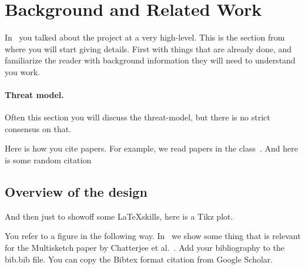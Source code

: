 \section{Background and Related Work}
\label{sec:relwork}
In~ you talked about the project at a very high-level. This is
the section from where you will start giving details. First with things that are
already done, and familiarize the reader with background information they will
need to understand you work. 


\paragraph{Threat model.}
Often this section you will discuss the threat-model, but there is no strict consensus on that. 


Here is how you cite papers. For example, we read papers in the
class~\cite{rahul2016pwtypos,dodisetal:2004}.  And here is some random citation~\cite{Bojinov:2010:KLP,schechter:2010:pen,everspaugh2015pythia,bellare2009format,Juels:2014}


\subsection{Overview of the design}
\label{sec:overview}

And then just to showoff some \LaTeX skills, here is a Tikz plot.


You refer to a figure in the following way. In~ we show
some thing that is relevant for the Multisketch paper by Chatterjee et
al.~\cite{chatterjee2019multisketches}. Add your bibliography to the
\textsf{bib.bib} file. You can copy the Bibtex format citation from Google
Scholar.

